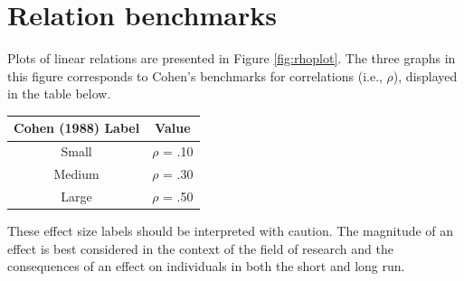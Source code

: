 \documentclass[
]{krantz}
\begin{document}
\hypertarget{relation-benchmarks}{%
\section{Relation benchmarks}\label{relation-benchmarks}}

Plots of linear relations are presented in Figure \ref{fig:rhoplot}. The three graphs in this figure corresponds to Cohen's benchmarks for correlations (i.e., \(\rho\)), displayed in the table below.

\begin{longtable}[]{@{}cc@{}}
\toprule
Cohen (1988) Label & Value \\
\midrule
\endhead
Small & \(\rho\) = .10 \\
Medium & \(\rho\) = .30 \\
Large & \(\rho\) = .50 \\
\bottomrule
\end{longtable}

These effect size labels should be interpreted with caution. The magnitude of an effect is best considered in the context of the field of research and the consequences of an effect on individuals in both the short and long run.
\end{document}
